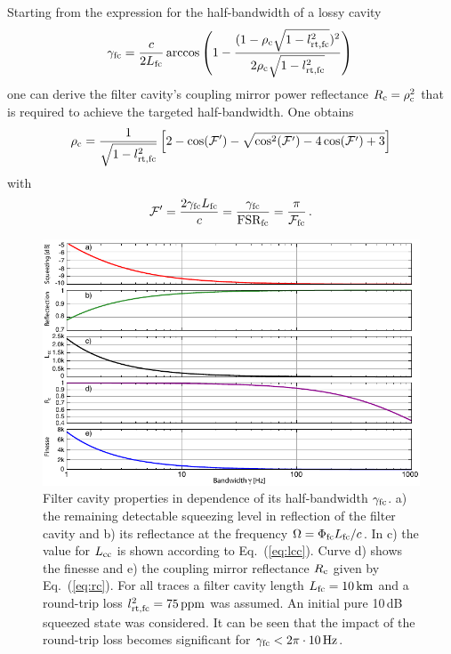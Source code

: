 Starting from the expression for the
half-bandwidth of a lossy cavity
\begin{equation} \gamma_{\rm fc} = \frac{c}{2 L_{\rm fc}}
\arccos\left(1-\frac{(1-\rho_{\rm c}\sqrt{1- l^2_{\rm
rt,fc}})^2}{2\rho_{\rm c}\sqrt{1- l^2_{\rm
rt,fc}}}\right)\,\label{eq:gamma}
\end{equation}
one can derive the filter cavity's coupling mirror power reflectance
$R_{\rm c}=\rho_{\rm c}^2$
 that is required to achieve the
targeted half-bandwidth. One obtains
\begin{equation}
\rho_{\rm c} = \frac{1}{\sqrt{1- l^2_{\rm
rt,fc}}}\left[2-\cos(\mathcal{F}^\prime) -
\sqrt{\cos^2(\mathcal{F}^\prime)-4 \cos(\mathcal{F}^\prime)+3}
\right]\label{eq:rc}
\end{equation}
with
\begin{equation}
\mathcal{F}^\prime =  \frac{2 \gamma_{\rm fc} L_{\rm fc}}{c} =
\frac{\gamma_{\rm fc}}{{\rm FSR_{fc}}}
=\frac{\pi}{\mathcal{F}_{\rm fc}}\,.
\end{equation}

\begin{figure}
\centering
\includegraphics[scale = 1.2]{./Sec_Optics/FCsgammaAI75ppm.pdf}
\caption{Filter cavity properties in dependence of its half-bandwidth $\gamma_{\rm fc}$.  a) the remaining detectable squeezing level in reflection of the filter cavity and b) its reflectance at the frequency $\Omega =  \Phi_{\rm fc}L_{\rm fc}/c$. In c) the value for $L_{\rm cc}$ is shown according to Eq.~(\ref{eq:lcc}).  Curve d) shows the finesse and e) the coupling mirror reflectance $R_{\rm c}$ given by Eq.~(\ref{eq:rc}). For all traces a filter cavity length $L_{\rm fc}=10\,{\rm km}$ and a round-trip loss $l_{\rm rt,fc}^2=75\,{\rm ppm}$ was assumed. An initial pure 10\,dB squeezed state was considered. It can be seen that the impact of the round-trip loss becomes significant for $\gamma_{\rm fc}<2\pi\cdot10\,{\rm Hz}$.} \label{fig:gamma}
\end{figure}

